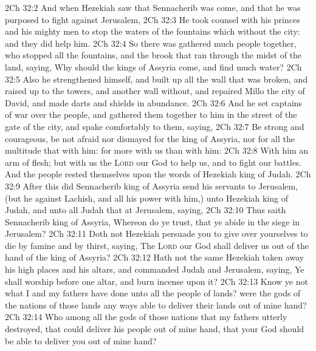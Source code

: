 \vs 2Ch 32:2 And when Hezekiah saw that Sennacherib was come, and that he was purposed to fight against Jerusalem,
\vs 2Ch 32:3 He took counsel with his princes and his mighty men to stop the waters of the fountains which  without the city: and they did help him.
\vs 2Ch 32:4 So there was gathered much people together, who stopped all the fountains, and the brook that ran through the midst of the land, saying, Why should the kings of Assyria come, and find much water?
\vs 2Ch 32:5 Also he strengthened himself, and built up all the wall that was broken, and raised  up to the towers, and another wall without, and repaired Millo  the city of David, and made darts and shields in abundance.
\vs 2Ch 32:6 And he set captains of war over the people, and gathered them together to him in the street of the gate of the city, and spake comfortably to them, saying,
\vs 2Ch 32:7 Be strong and courageous, be not afraid nor dismayed for the king of Assyria, nor for all the multitude that  with him: for  more with us than with him:
\vs 2Ch 32:8 With him  an arm of flesh; but with us  the \textsc{Lord} our God to help us, and to fight our battles. And the people rested themselves upon the words of Hezekiah king of Judah.
\vs 2Ch 32:9 After this did Sennacherib king of Assyria send his servants to Jerusalem, (but he  against Lachish, and all his power with him,) unto Hezekiah king of Judah, and unto all Judah that  at Jerusalem, saying,
\vs 2Ch 32:10 Thus saith Sennacherib king of Assyria, Whereon do ye trust, that ye abide in the siege in Jerusalem?
\vs 2Ch 32:11 Doth not Hezekiah persuade you to give over yourselves to die by famine and by thirst, saying, The \textsc{Lord} our God shall deliver us out of the hand of the king of Assyria?
\vs 2Ch 32:12 Hath not the same Hezekiah taken away his high places and his altars, and commanded Judah and Jerusalem, saying, Ye shall worship before one altar, and burn incense upon it?
\vs 2Ch 32:13 Know ye not what I and my fathers have done unto all the people of  lands? were the gods of the nations of those lands any ways able to deliver their lands out of mine hand?
\vs 2Ch 32:14 Who  among all the gods of those nations that my fathers utterly destroyed, that could deliver his people out of mine hand, that your God should be able to deliver you out of mine hand?
